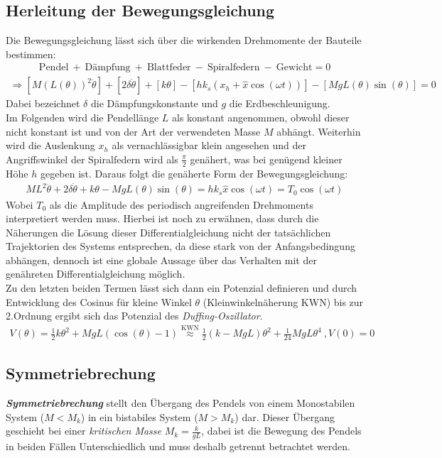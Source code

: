 \subsection{Herleitung der Bewegungsgleichung}
\label{sub:bewegungsgleichung}
Die Bewegungsgleichung lässt sich über die wirkenden Drehmomente der Bauteile bestimmen:
\begin{gather*}
        \text{Pendel}~+~\text{Dämpfung}~+~\text{Blattfeder}~-~\text{Spiralfedern}~-~\text{Gewicht} = 0
\end{gather*}
\begin{gather}
    \Rightarrow [M(L(\theta))^2\ddot{\theta}]+[2\delta\dot{\theta}]+[k\theta]-[hk_s(x_h+\hat{x}\cos(\omega t))]-[MgL(\theta)\sin(\theta)]=0
\end{gather}
Dabei bezeichnet $\delta$ die Dämpfungskonstante und $g$ die Erdbeschleunigung.\\
Im Folgenden wird die Pendellänge $L$ als konstant angenommen, obwohl dieser nicht konstant ist und von der Art der verwendeten Masse $M$ abhängt. Weiterhin wird die Auslenkung $x_h$ als vernachlässigbar klein angesehen und der Angriffswinkel der Spiralfedern wird als $\frac{\pi}{2}$ genähert, was bei genügend kleiner Höhe $h$ gegeben ist.
Daraus folgt die genäherte Form der Bewegungsgleichung:
\begin{gather}
    ML^2\ddot{\theta}+2\delta\dot{\theta}+k\theta-MgL(\theta)\sin(\theta)=hk_s\hat{x}\cos(\omega t)=T_0\cos(\omega t)
\end{gather}
Wobei $T_0$ als die Amplitude des periodisch angreifenden Drehmoments interpretiert werden muss. Hierbei ist noch zu erwähnen, dass durch die Näherungen die Lösung dieser Differentialgleichung nicht der tatsächlichen Trajektorien des Systems entsprechen, da diese stark von der Anfangsbedingung abhängen, dennoch ist eine globale Aussage über das Verhalten mit der genähreten Differentialgleichung möglich.\\
Zu den letzten beiden Termen lässt sich dann ein Potenzial definieren und durch Entwicklung des Cosinus für kleine Winkel $\theta$ (Kleinwinkelnäherung KWN) bis zur 2.Ordnung ergibt sich das Potenzial des \textit{Duffing-Oszillator}. \citep{Lueck}
\begin{gather}
    V(\theta) = \frac{1}{2}k\theta^2 + MgL(\cos(\theta)-1)\overset{\text{KWN}}{\approx}\frac{1}{2}(k-MgL)\theta^2 + \frac{1}{24}MgL\theta^4~,V(0)=0
\end{gather}

\subsection{Symmetriebrechung}
\label{sub:symbrechung}
\textit{\textbf{Symmetriebrechung}} stellt den Übergang des Pendels von einem Monostabilen System ($M<M_k$) in ein bistabiles System ($M>M_k$) dar. Dieser Übergang geschieht bei einer \textit{kritischen Masse} $M_k=\frac{k}{gL}$, dabei ist die Bewegung des Pendels in beiden Fällen Unterschiedlich und muss deshalb getrennt betrachtet werden. \citep{Lueck}

